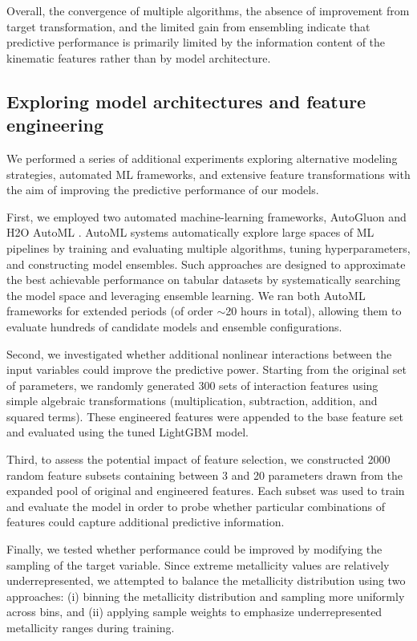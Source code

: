 \documentclass{aa}
\begin{document}
Overall, the convergence of multiple algorithms, the absence of improvement from target transformation, and the limited gain from ensembling indicate that predictive performance is primarily limited by the information content of the kinematic features rather than by
model architecture.

\subsection{Exploring model architectures and feature engineering}

We performed a series of additional experiments exploring alternative modeling strategies, automated ML frameworks, and extensive feature transformations with the aim of improving the predictive performance of our models.

First, we employed two automated machine-learning frameworks, AutoGluon \citep{Erickson2020} and H2O AutoML \citep{LeDell2020}. AutoML systems automatically explore large spaces of ML pipelines by training and evaluating multiple algorithms, tuning hyperparameters, and constructing model ensembles. Such approaches are designed to approximate the best achievable performance on tabular datasets by systematically searching the model space and leveraging ensemble learning. We ran both AutoML frameworks for extended periods (of order $\sim$20 hours in total), allowing them to evaluate hundreds of candidate models and ensemble configurations.

Second, we investigated whether additional nonlinear interactions between the input variables could improve the predictive power. Starting from the original set of parameters, we randomly generated 300 sets of interaction features using simple algebraic transformations (multiplication, subtraction, addition, and squared terms). These engineered features were appended to the base feature set and evaluated using the tuned LightGBM model.

Third, to assess the potential impact of feature selection, we constructed 2000 random feature subsets containing between 3 and 20 parameters drawn from the expanded pool of original and engineered features. Each subset was used to train and evaluate the model in order to probe whether particular combinations of features could capture additional predictive information.

Finally, we tested whether performance could be improved by modifying the sampling of the target variable. Since extreme metallicity values are relatively underrepresented, we attempted to balance the metallicity distribution using two approaches: (i) binning the metallicity distribution and sampling more uniformly across bins, and (ii) applying sample weights to emphasize underrepresented metallicity ranges during training.
\end{document}
